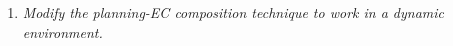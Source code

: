 \begin{enumerate}[(i)]
\begin{enumerate}
 \item \label{obj:} \textit{Modify the planning-EC composition technique to work in a dynamic environment.}\\
 
 
 

\end{enumerate}
\end{enumerate}
